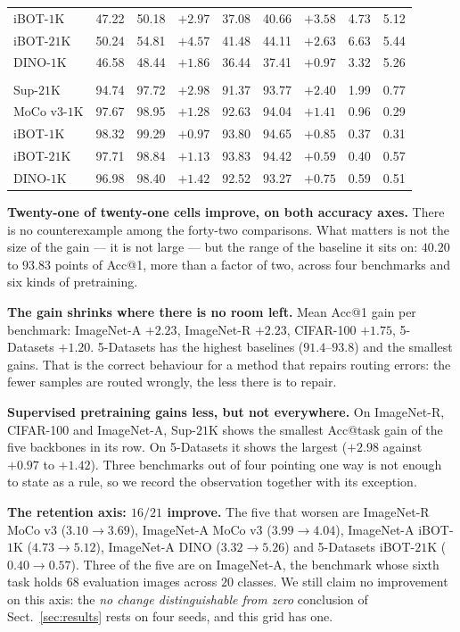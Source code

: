 \documentclass[11pt,a4paper]{article}
\begin{document}
\begin{table}[htbp]
\begin{tabular}{@{}lrrrrrrrr@{}}
iBOT-$1$K     & 47.22 & 50.18 & $+2.97$ & 37.08 & 40.66 & $+3.58$ & 4.73 & 5.12 \\
iBOT-$21$K    & 50.24 & 54.81 & $+4.57$ & 41.48 & 44.11 & $+2.63$ & 6.63 & 5.44 \\
DINO-$1$K     & 46.58 & 48.44 & $+1.86$ & 36.44 & 37.41 & $+0.97$ & 3.32 & 5.26 \\
\addlinespace
\multicolumn{9}{@{}l}{\emph{5-Datasets}}\\
Sup-$21$K     & 94.74 & 97.72 & $+2.98$ & 91.37 & 93.77 & $+2.40$ & 1.99 & 0.77 \\
MoCo v3-$1$K  & 97.67 & 98.95 & $+1.28$ & 92.63 & 94.04 & $+1.41$ & 0.96 & 0.29 \\
iBOT-$1$K     & 98.32 & 99.29 & $+0.97$ & 93.80 & 94.65 & $+0.85$ & 0.37 & 0.31 \\
iBOT-$21$K    & 97.71 & 98.84 & $+1.13$ & 93.83 & 94.42 & $+0.59$ & 0.40 & 0.57 \\
DINO-$1$K     & 96.98 & 98.40 & $+1.42$ & 92.52 & 93.27 & $+0.75$ & 0.59 & 0.51 \\
\bottomrule
\end{tabular}
\end{table}

\textbf{Twenty-one of twenty-one cells improve, on both accuracy axes.} There is
no counterexample among the forty-two comparisons. What matters is not the size
of the gain --- it is not large --- but the range of the baseline it sits on:
$40.20$ to $93.83$ points of Acc@1, more than a factor of two, across four
benchmarks and six kinds of pretraining.

\textbf{The gain shrinks where there is no room left.} Mean Acc@1 gain per
benchmark: ImageNet-A $+2.23$, ImageNet-R $+2.23$, CIFAR-100 $+1.75$,
5-Datasets $+1.20$. 5-Datasets has the highest baselines ($91.4$--$93.8$) and
the smallest gains. That is the correct behaviour for a method that repairs
routing errors: the fewer samples are routed wrongly, the less there is to
repair.

\textbf{Supervised pretraining gains less, but not everywhere.} On ImageNet-R,
CIFAR-100 and ImageNet-A, Sup-$21$K shows the smallest Acc@task gain of the five
backbones in its row. On 5-Datasets it shows the largest ($+2.98$ against
$+0.97$ to $+1.42$). Three benchmarks out of four pointing one way is not enough
to state as a rule, so we record the observation together with its exception.

\textbf{The retention axis: $16/21$ improve.} The five that worsen are
ImageNet-R MoCo v3 ($3.10 \to 3.69$), ImageNet-A MoCo v3 ($3.99 \to 4.04$),
ImageNet-A iBOT-$1$K ($4.73 \to 5.12$), ImageNet-A DINO ($3.32 \to 5.26$) and
5-Datasets iBOT-$21$K ($0.40 \to 0.57$). Three of the five are on ImageNet-A,
the benchmark whose sixth task holds $68$ evaluation images across $20$ classes.
We still claim no improvement on this axis: the \emph{no change distinguishable
from zero} conclusion of Sect.~\ref{sec:results} rests on four seeds, and this
grid has one.
\end{document}
